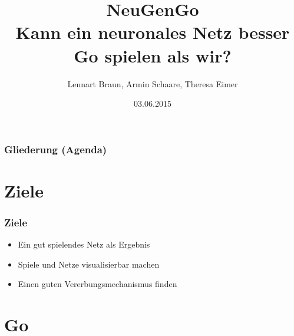 \documentclass[compress]{beamer}
\title{NeuGenGo \\ Kann ein neuronales Netz besser Go spielen als wir?}
\author{Lennart Braun, Armin Schaare, Theresa Eimer}
\institute{Praktikum Parallele Programmierung \\Fachbereich Informatik\\Universität Hamburg}
\date{03.06.2015}
\begin{document}
\begin{frame}
	\titlepage
\end{frame}

\begin{frame}
	\frametitle{Gliederung (Agenda)}

	\tableofcontents
\end{frame}

\section{Ziele}

\begin{frame}
	\frametitle{Ziele}
	
	\begin{itemize}
		\item Ein gut spielendes Netz als Ergebnis
		\item Spiele und Netze visualisierbar machen
		\item Einen guten Vererbungsmechanismus finden
	\end{itemize}
	
\end{frame}

\section{Go}
\end{document}
